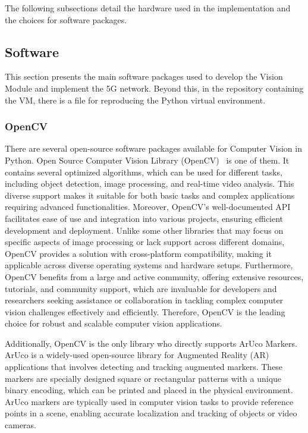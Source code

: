 The following subsections detail the hardware used in the implementation and the choices for software packages.


\subsection{Software}\label{subsec:software}
This section presents the main software packages used to develop the Vision Module and implement the 5G network.
Beyond this, in the repository containing the VM, there is a file for reproducing the Python virtual environment.

\subsubsection{OpenCV}
There are several open-source software packages available for Computer Vision in Python.
Open Source Computer Vision Library (OpenCV)~\cite{opencv} is one of them.
It contains several optimized algorithms, which can be used for different tasks, including object detection, image processing, and real-time video analysis.
This diverse support makes it suitable for both basic tasks and complex applications requiring advanced functionalities.
Moreover, OpenCV's well-documented API facilitates ease of use and integration into various projects, ensuring efficient development and deployment.
Unlike some other libraries that may focus on specific aspects of image processing or lack support across different domains, OpenCV provides a solution with cross-platform compatibility, making it applicable across diverse operating systems and hardware setups.
Furthermore, OpenCV benefits from a large and active community, offering extensive resources, tutorials, and community support, which are invaluable for developers and researchers seeking assistance or collaboration in tackling complex computer vision challenges effectively and efficiently.
Therefore, OpenCV is the leading choice for robust and scalable computer vision applications.

Additionally, OpenCV is the only library who directly supports ArUco Markers.
ArUco is a widely-used open-source library for Augmented Reality (AR) applications that involves detecting and tracking augmented markers.
These markers are specially designed square or rectangular patterns with a unique binary encoding, which can be printed and placed in the physical environment.
ArUco markers are typically used in computer vision tasks to provide reference points in a scene, enabling accurate localization and tracking of objects or video cameras.

